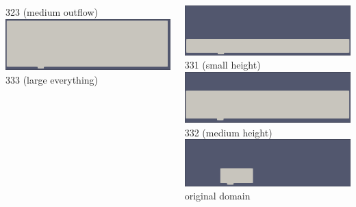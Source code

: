 \documentclass[
	aspectratio=169, %
	t, %
	onlytextwidth, %
	10pt, %
]{beamer}
\begin{document}
\begin{frame}
\begin{columns}[T]
\begin{column}{0.3\linewidth}
			{\tiny\textcolor{ICLBlue}{323 (medium outflow)}}\\[2pt]
			\includegraphics[width=\linewidth]{Images/333.png}
			{\tiny\textcolor{ICLBlue}{333 (large everything)}}\\[2pt]
		\end{column}
		\begin{column}{0.3\linewidth} %
			\includegraphics[width=\linewidth]{Images/331.png}
			{\tiny\textcolor{ICLBlue}{331 (small height)}}\\[2pt]
			\includegraphics[width=\linewidth]{Images/332.png}
			{\tiny\textcolor{ICLBlue}{332 (medium height)}}\\[2pt]
			\includegraphics[width=\linewidth]{Images/original.png}
			{\tiny\textcolor{ICLBlue}{original domain}}\\[2pt]
		\end{column}
	\end{columns}
\end{frame}
\end{document}

